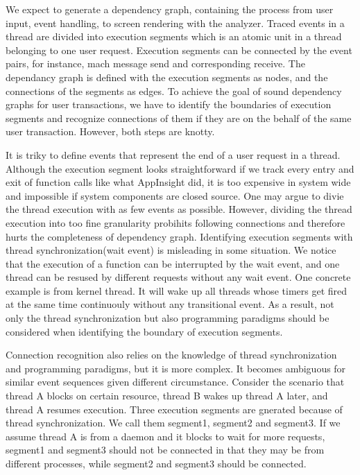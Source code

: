 We expect to generate a dependency graph, containing the process from user input, event handling, to screen rendering with the analyzer.
Traced events in a thread are divided into execution segments which is an atomic unit in a thread belonging to one user request.
Execution segments can be connected by the event pairs, for instance, mach message send and corresponding receive.
The dependancy graph is defined with the execution segments as nodes, and the connections of the segments as edges.
To achieve the goal of sound dependency graphs for user transactions, we have to identify the boundaries of execution segments and recognize connections of them if they are on the behalf of the same user transaction.
However, both steps are knotty. 
\par
It is triky to define events that represent the end of a user request in a thread.
Although the execution segment looks straightforward if we track every entry and exit of function calls like what AppInsight did,
it is too expensive in system wide and impossible if system components are closed source.
One may argue to divie the thread execution with as few events as possible. 
However, dividing the thread execution into too fine granularity probihits following connections and therefore hurts the completeness of dependency graph.
Identifying execution segments with thread synchronization(wait event) is misleading in some situation.
We notice that the execution of a function can be interrupted by the wait event, and one thread can be resused by different requests without any wait event.
One concrete example is from kernel thread.
It will wake up all threads whose timers get fired at the same time continuouly without any transitional event.
As a result, not only the thread synchronization but also programming paradigms should be considered when identifying the boundary of execution segments.
\par
Connection recognition also relies on the knowledge of thread synchronization and programming paradigms, but it is more complex.
It becomes ambiguous for similar event sequences given different circumstance.
Consider the scenario that thread A blocks on certain resource, thread B wakes up thread A later, and thread A resumes execution.
Three execution segments are gnerated because of thread synchronization.
We call them segment1, segment2 and segment3.
If we assume thread A is from a daemon and it blocks to wait for more requests, segment1 and segment3 should not be connected in that they may be from different processes, while segment2 and segment3 should be connected.
